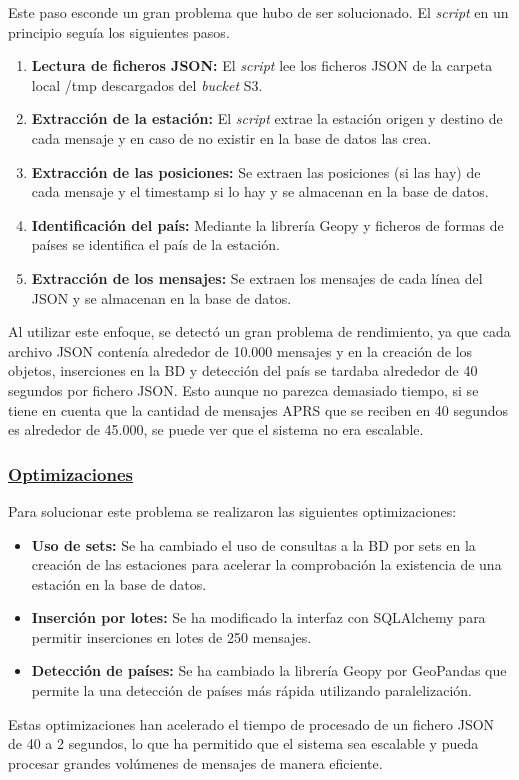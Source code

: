 Este paso esconde un gran problema que hubo de ser solucionado. El \textit{script} en un principio seguía los siguientes pasos.

\begin{enumerate}
	\item \textbf{Lectura de ficheros JSON:} El \textit{script} lee los ficheros JSON de la carpeta local /tmp descargados del \textit{bucket} S3.
	\item \textbf{Extracción de la estación:} El \textit{script} extrae la estación origen y destino de cada mensaje y en caso de no existir en la base de datos las crea.
	\item \textbf{Extracción de las posiciones:} Se extraen las posiciones (si las hay) de cada mensaje y el timestamp si lo hay y se almacenan en la base de datos.
	\item \textbf{Identificación del país:} Mediante la librería Geopy y ficheros de formas de países se identifica el país de la estación.
	\item \textbf{Extracción de los mensajes:} Se extraen los mensajes de cada línea del JSON y se almacenan en la base de datos.
\end{enumerate}

\noindent Al utilizar este enfoque, se detectó un gran problema de rendimiento, ya que cada archivo JSON contenía alrededor de 10.000 mensajes y en la creación de los objetos, inserciones en la BD y detección del país se tardaba alrededor de 40 segundos por fichero JSON. Esto aunque no parezca demasiado tiempo, si se tiene en cuenta que la cantidad de mensajes APRS que se reciben en 40 segundos es alrededor de 45.000, se puede ver que el sistema no era escalable.

\subsubsection*{\underline{Optimizaciones}}
Para solucionar este problema se realizaron las siguientes optimizaciones:
\begin{itemize}
	\item \textbf{Uso de sets:} Se ha cambiado el uso de consultas a la BD por sets en la creación de las estaciones para acelerar la comprobación la existencia de una estación en la base de datos.
	\item \textbf{Inserción por lotes:} Se ha modificado la interfaz con SQLAlchemy para permitir inserciones en lotes de 250 mensajes.
	\item \textbf{Detección de países:} Se ha cambiado la librería Geopy por GeoPandas que permite la una detección de países más rápida utilizando paralelización.
\end{itemize}
Estas optimizaciones han acelerado el tiempo de procesado de un fichero JSON de 40 a 2 segundos, lo que ha permitido que el sistema sea escalable y pueda procesar grandes volúmenes de mensajes de manera eficiente.

